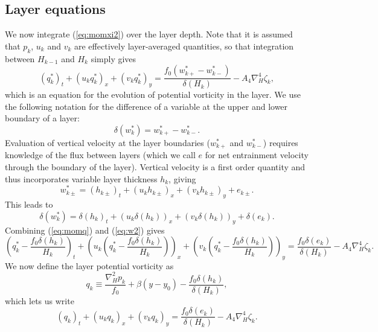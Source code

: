 \documentclass[11pt, a4paper,twoside]{article}
\numberwithin{equation}{section}
\begin{document}
\subsection{Layer equations}
We now integrate (\ref{eq:momxi2}) over the layer depth.
Note that it is assumed that $p_k$, $u_k$ and $v_k$ are effectively layer-averaged quantities, so that integration between $H_{k-1}$ and $H_{k}$ simply gives
\begin{equation}\label{eq:momq}
\left(q^*_k\right)_t  + \left(u_k q^*_k \right)_x  + \left(v_kq^*_k\right)_y  = \frac{f_0 (w_{k+}^* -w_{k-}^*)}{\delta\left(H_{k}\right)} - A_4\nabla_H^4\zeta_k,
\end{equation}
which is an equation for the evolution of potential vorticity in the layer.
We use the following notation for the difference of a variable at the upper and lower boundary of a layer:
\begin{equation}
\delta\left(w^*_k\right) = w_{k+}^* - w_{k-}^*.
\end{equation}
Evaluation of vertical velocity at the layer boundaries ($w_{k+}^*$ and $w_{k-}^*$) requires knowledge of the flux between layers (which we call $e$ for net entrainment velocity through the boundary of the layer).
Vertical velocity is a first order quantity and thus incorporates variable layer thickness $h_k$, giving
\begin{equation}\label{eq:w1}
w_{k\pm}^* =  (h_{k\pm})_t + (u_{k} h_{k\pm})_x + (v_{k} h_{k\pm})_y + e_{k\pm}.
\end{equation}
This leads to
\begin{equation}\label{eq:w2}
\delta\left(w_k^*\right) =  \delta\left(h_{k}\right)_t + \left(u_{k} \delta\left(h_{k}\right)\right)_x + \left(v_{k} \delta\left(h_k\right)\right)_y + \delta\left(e_k\right).
\end{equation}
Combining (\ref{eq:momq}) and (\ref{eq:w2}) gives
\begin{equation}
\left(q^*_k - \frac{f_0\delta\left(h_k\right)}{H_k}\right)_t  + \left(u_k \left(q^*_k - \frac{f_0\delta\left(h_k\right)}{H_k}\right)\right)_x  + \left(v_k\left(q^*_k -\frac{f_0\delta\left(h_k\right)}{H_k}\right)\right)_y  = \frac{f_0 \delta\left(e_k\right)}{\delta\left(H_{k}\right)} - A_4\nabla_H^4\zeta_k.
\end{equation}
We now define the layer potential vorticity as
\begin{equation}\label{eq:layerpv}
q_k \equiv \frac{\nabla_H^2 p_k}{f_0} + \beta(y - y_0) - \frac{f_0\delta\left(h_k\right)}{\delta\left(H_k\right)},
\end{equation}
which lets us write
\begin{equation}\label{eq:dynamic}
\left(q_k\right)_t  + \left(u_kq_k\right)_x  + \left(v_kq_k\right)_y  = \frac{f_0 \delta\left(e_k\right)}{\delta\left(H_{k}\right)} - A_4\nabla_H^4\zeta_k.
\end{equation}
\end{document}
